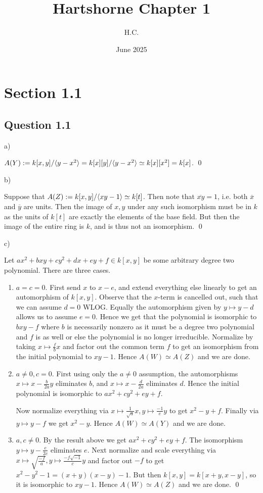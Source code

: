 \documentclass{article}
\title{Hartshorne Chapter 1}
\author{H.C.}
\date{June 2025}
\begin{document}
\maketitle

\section*{Section 1.1}
\subsection*{Question 1.1}

\noindent a)

$A(Y) := k[x,y]/\langle y-x^2\rangle = k[x][y]/\langle y-x^2\rangle \simeq k[x][x^2] = k[x]$. \qed

\noindent b)

Suppose that $A(Z) := k[x,y]/\langle xy-1\rangle \simeq k[t]$. Then note that $\overline {xy} = 1$, i.e. both $\overline x$ and $\overline y$ are units. Then the image of $x,y$ under any such isomorphism must be in $k$ as the units of $k[t]$ are exactly the elements of the base field. But then the image of the entire ring is $k$, and is thus not an isomorphism. \qed

\noindent c)

Let $ax^2 + bxy + cy^2 + dx + ey + f \in k[x,y]$ be some arbitrary degree two polynomial. There are three cases.

\begin{enumerate}
    \item $a = c = 0$. First send $x$ to $x-e$, and extend everything else linearly to get an automorphism of $k[x,y]$. Observe that the $x$-term is cancelled out, such that we can assume $d=0$ WLOG. Equally the automorphism given by $y \mapsto y - d$ allows us to assume $e = 0$. Hence we get that the polynomial is isomorphic to $bxy - f$ where $b$ is necessarily nonzero as it must be a degree two polynomial and $f$ is as well or else the polynomial is no longer irreducible. Normalize by taking $x \mapsto \frac{f}{b}x$ and factor out the common term $f$ to get an isomorphism from the initial polynomial to $xy-1$. Hence $A(W) \simeq A(Z)$ and we are done.
    
    \item $a\neq0, c=0$. First using only the $a\neq0$ assumption, the automorphisms $x \mapsto x - \frac{b}{2a}y$ eliminates $b$, and $x \mapsto x - \frac{d}{2a}$ eliminates $d$. Hence the initial polynomial is isomorphic to $ax^2 + cy^2 + ey + f$.
    
    Now normalize everything via $x \mapsto \frac{1}{\sqrt{a}}x, y \mapsto \frac{-1}{e}y$ to get $x^2 - y + f$. Finally via $y \mapsto y - f$ we get $x^2 - y$. Hence $A(W) \simeq A(Y)$ and we are done.
    
    \item $a,c \neq 0$. By the result above we get $ax^2 + cy^2 + ey + f$. The isomorphism $y \mapsto y-\frac{e}{2c}$ eliminates $e$. Next normalize and scale everything via $x \mapsto \sqrt{\frac{-f}{a}}, y \mapsto \frac{-f\sqrt{-1}}{c}y$ and factor out $-f$ to get $x^2 - y^2 -1 = (x+y)(x-y) -1$. But then $k[x,y] = k[x+y,x-y]$, so it is isomorphic to $xy-1$. Hence $A(W) \simeq A(Z)$ and we are done. \qed
\end{enumerate}
\end{document}
